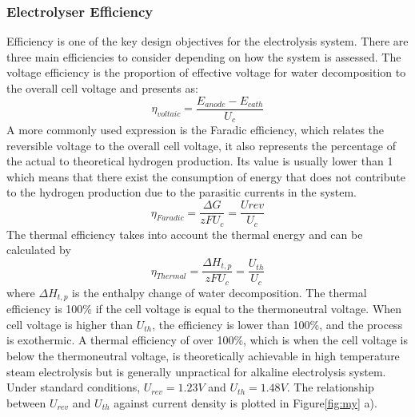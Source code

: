 \documentclass[11pt, a4paper]{article}
\begin{document}
\subsubsection{Electrolyser Efficiency }  
Efficiency is one of the key design objectives for the electrolysis system. There are three main efficiencies to consider depending on how the system is assessed.\cite{currentdensity} The voltage efficiency is the proportion of effective voltage for water decomposition to the overall cell voltage and presents as:
\begin{equation}
\eta_{voltaic} = \frac{E_{anode} - E_{cath} }{U_c}
\end{equation}
A more commonly used expression is the Faradic efficiency, which relates the reversible voltage to the overall cell voltage, it also represents the percentage of the actual to theoretical hydrogen production. Its value is usually lower than 1 which means that there exist the consumption of energy that does not contribute to the hydrogen production due to the parasitic currents in the system. \cite{currentdensity}
\begin{equation}
\eta_{Faradic} = \frac{\Delta G}{zFU_c} = \frac{U{rev}}{U_c} 
\end{equation}
The thermal efficiency takes into account the thermal energy and can be calculated by
\begin{equation}
\eta_{Thermal} = \frac{\Delta H_{t,p}}{zFU_c} = \frac{U_{th}}{U_c} 
\end{equation} 
where $\Delta H_{t,p}$ is the enthalpy change of water decomposition. The thermal efficiency is 100\% if the cell voltage is equal to the thermoneutral voltage. When cell voltage is higher than $U_{th}$, the efficiency is lower than 100\%, and the process is exothermic. A thermal efficiency of over 100\%, which is when the cell voltage is below the thermoneutral voltage,  is theoretically achievable in high temperature steam electrolysis but is generally unpractical for alkaline electrolysis system. Under standard conditions, $U_{rev} = 1.23V$ and $U_{th} = 1.48V$. The relationship between $U_{rev}$ and $U_{th}$ against current density is plotted in Figure\ref{fig:my} a).
\end{document}
